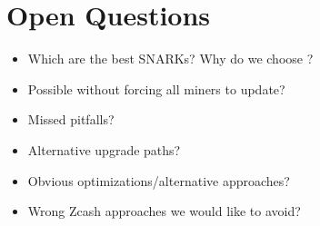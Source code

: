 \section{Open Questions}
  \begin{itemize}
    \item Which are the best SNARKs? Why do we choose \TODO{}?
    \item Possible without forcing all miners to update?
    \item Missed pitfalls?
    \item Alternative upgrade paths?
    \item Obvious optimizations/alternative approaches?
    \item Wrong Zcash approaches we would like to avoid?
  \end{itemize}
